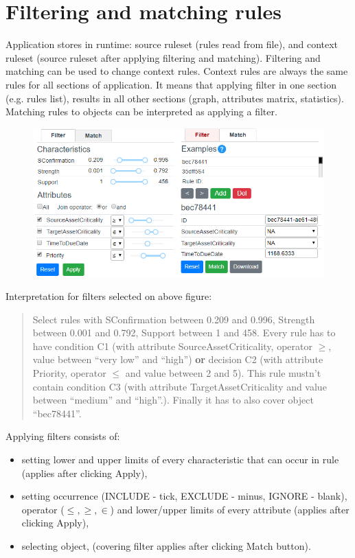 \documentclass[12pt]{article}
\begin{document}
\section{Filtering and matching rules}

Application stores in runtime: source ruleset (rules read from file), and context ruleset (source ruleset after applying filtering and matching). Filtering and matching can be used to change context rules. Context rules are always the same rules for all sections of application. It means that applying filter in one section (e.g. rules list), results in all other sections (graph, attributes matrix, statistics). Matching rules to objects can be interpreted as applying a filter.

\begin{figure}[H]
    \centering
    \includegraphics[width=\textwidth]{figures/B-filtering.png}
\end{figure}

Interpretation for filters selected on above figure:
\begin{quote}Select rules with SConfirmation between 0.209 and 0.996, Strength between 0.001 and 0.792, Support between 1 and 458. Every rule has to have condition C1 (with attribute SourceAssetCriticality, operator $\ge$, value between ``very low'' and ``high'') \textbf{or} decision C2 (with attribute Priority, operator $\le$ and value between 2 and 5). This rule mustn't contain condition C3 (with attribute TargetAssetCriticality and value between ``medium'' and ``high''.). Finally it has to also cover object ``bec78441''.
\end{quote}

Applying filters consists of:
\begin{itemize}
    \setlength\itemsep{0em}
    \item setting lower and upper limits of every characteristic that can occur in rule (applies after clicking Apply),
    \item setting occurrence (INCLUDE - tick, EXCLUDE - minus, IGNORE - blank), operator ($\le, \ge, \in$) and lower/upper limits of every attribute (applies after clicking Apply),
    \item selecting object, (covering filter applies after clicking Match button).
\end{itemize}
\end{document}
